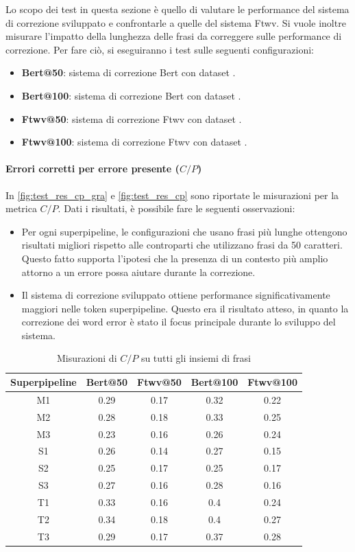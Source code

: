 Lo scopo dei test in questa sezione è quello di valutare le performance del sistema di correzione sviluppato e confrontarle a quelle del sistema Ftwv. Si vuole inoltre misurare l'impatto della lunghezza delle frasi da correggere sulle performance di correzione. Per fare ciò, si eseguiranno i test sulle seguenti configurazioni:
\begin{itemize}
\item \textbf{Bert@50}: sistema di correzione Bert con dataset \dsta.
\item \textbf{Bert@100}: sistema di correzione Bert con dataset \dstb.
\item \textbf{Ftwv@50}: sistema di correzione Ftwv con dataset \dsta.
\item \textbf{Ftwv@100}: sistema di correzione Ftwv con dataset \dstb.
\end{itemize}





\paragraph{Errori corretti per errore presente ($C/P$)}
In \autoref{fig:test_res_cp_gra} e \autoref{fig:test_res_cp} sono riportate le misurazioni per la metrica $C/P$. Dati i risultati, è possibile fare le seguenti osservazioni:
\begin{itemize}
\item Per ogni superpipeline, le configurazioni che usano frasi più lunghe ottengono risultati migliori rispetto alle controparti che utilizzano frasi da 50 caratteri. Questo fatto supporta l'ipotesi che la presenza di un contesto più amplio attorno a un errore possa aiutare durante la correzione.

\item Il sistema di correzione sviluppato ottiene performance significativamente maggiori nelle token superpipeline. Questo era il risultato atteso, in quanto la correzione dei word error è stato il focus principale durante lo sviluppo del sistema.

\end{itemize}

\begin{table}[H]
\centering
\begin{tabular}{c|cc|cc}
\textbf{Superpipeline} & \textbf{Bert@50} &  \textbf{Ftwv@50} & \textbf{Bert@100} & \textbf{Ftwv@100}\\
\hline
M1& 0.29& 0.17& 0.32& 0.22\\
M2& 0.28& 0.18& 0.33& 0.25\\
M3& 0.23& 0.16& 0.26& 0.24\\
S1& 0.26& 0.14& 0.27& 0.15\\
S2& 0.25& 0.17& 0.25& 0.17\\
S3& 0.27& 0.16& 0.28& 0.16\\
T1& 0.33& 0.16& 0.4& 0.24\\
T2& 0.34& 0.18& 0.4& 0.27\\
T3& 0.29& 0.17& 0.37& 0.28\\
\end{tabular}
\caption{Misurazioni di $C/P$ su tutti gli insiemi di frasi}
\label{fig:test_res_cp_gra}
\end{table}

